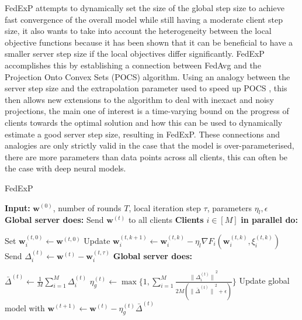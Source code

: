 \documentclass{article}
\newlength\myindent
\newcommand\bindent{%
  \begingroup
  \setlength{\itemindent}{\myindent}
  \addtolength{\algorithmicindent}{\myindent}
}
\newcommand\eindent{\endgroup}
\begin{document}
FedExP attempts to dynamically set the size of the global step size to achieve fast convergence of the overall model while still having a moderate client step size, it also wants to take into account the heterogeneity between the local objective functions because it has been shown that it can be beneficial to have a smaller server step size if the local objectives differ significantly. \cite{smallServerStepSizeForHetrogeneity}  FedExP accomplishes this by establishing a connection between FedAvg and the Projection Onto Convex Sets (POCS) algorithm.  Using an analogy between the server step size and the extrapolation parameter used to speed up POCS \cite{ExtrapolatedPOCS}, this then allows new extensions to the algorithm to deal with inexact and noisy projections, the main one of interest is a time-varying bound on the progress of clients towards the optimal solution and how this can be used to dynamically estimate a good server step size, resulting in FedExP.  These connections and analogies are only strictly valid in the case that the model is over-parameterised, there are more parameters than data points across all clients, this can often be the case with deep neural models.

\begin{algorithm}
\caption{FedExP}
\begin{algorithmic} 
\STATE \textbf{Input:} $\textbf{w}^{(0)}$, number of rounds $T$, local iteration step $\tau$, parameters $\eta_l, \epsilon$\\
    \STATE \textbf{Global server does:}
    \STATE Send $\textbf{w}^{(t)}$ to all clients
    \STATE \textbf{Clients} $i \in [M]$ \textbf{in parallel do:}
    \bindent
    \STATE Set $\textbf{w}_i^{(t,0)} \leftarrow \textbf{w}^{(t,0)}$    
            \STATE Update $\textbf{w}_i^{(t,k+1)} \leftarrow \textbf{w}_i^{(t,k)} - \eta_l \nabla F_i (\textbf{w}_i^{(t,k)}, \xi_i^{(t,k)})$
        \ENDFOR
        \STATE Send $\Delta_i^{(t)} \leftarrow \textbf{w}^{(t)} - \textbf{w}_i^{(t,\tau)}$
    \eindent
    \STATE \textbf{Global server does:}
    \bindent
    \STATE $\bar{\Delta}^{(t)} \leftarrow \frac{1}{M} \sum_{i=1}^{M}{\Delta_i^{(t)}}$
    \STATE $\eta_g^{(t)} \leftarrow \max\{1, \sum_{i=1}^{M}{\frac{{\lVert\Delta_i^{(t)}\rVert}^2}{2M({\lVert\bar{\Delta}^{(t)}\rVert}^{2} + \epsilon)}}\}$
    \STATE Update global model with $\textbf{w}^{(t+1)} \leftarrow \textbf{w}^{(t)} - \eta_g^{(t)}\bar{\Delta}^{(t)}$
    \eindent
\ENDFOR
\end{algorithmic}

\end{algorithm}
\end{document}
